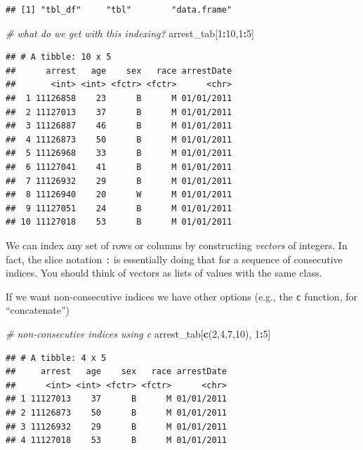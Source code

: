 \documentclass[]{book}
\newenvironment{Shaded}{\begin{snugshade}}{\end{snugshade}}
\newcommand{\KeywordTok}[1]{\textcolor[rgb]{0.13,0.29,0.53}{\textbf{#1}}}
\newcommand{\DecValTok}[1]{\textcolor[rgb]{0.00,0.00,0.81}{#1}}
\newcommand{\CommentTok}[1]{\textcolor[rgb]{0.56,0.35,0.01}{\textit{#1}}}
\newcommand{\OperatorTok}[1]{\textcolor[rgb]{0.81,0.36,0.00}{\textbf{#1}}}
\newcommand{\NormalTok}[1]{#1}
\theoremstyle{definition}
\theoremstyle{definition}
\theoremstyle{remark}
\begin{document}
\begin{verbatim}
## [1] "tbl_df"     "tbl"        "data.frame"
\end{verbatim}

\begin{Shaded}
\begin{Highlighting}[]
\CommentTok{# what do we get with this indexing?}
\NormalTok{arrest_tab[}\DecValTok{1}\OperatorTok{:}\DecValTok{10}\NormalTok{,}\DecValTok{1}\OperatorTok{:}\DecValTok{5}\NormalTok{]}
\end{Highlighting}
\end{Shaded}

\begin{verbatim}
## # A tibble: 10 x 5
##      arrest   age    sex   race arrestDate
##       <int> <int> <fctr> <fctr>      <chr>
##  1 11126858    23      B      M 01/01/2011
##  2 11127013    37      B      M 01/01/2011
##  3 11126887    46      B      M 01/01/2011
##  4 11126873    50      B      M 01/01/2011
##  5 11126968    33      B      M 01/01/2011
##  6 11127041    41      B      M 01/01/2011
##  7 11126932    29      B      M 01/01/2011
##  8 11126940    20      W      M 01/01/2011
##  9 11127051    24      B      M 01/01/2011
## 10 11127018    53      B      M 01/01/2011
\end{verbatim}

We can index any set of rows or columns by constructing \emph{vectors}
of integers. In fact, the slice notation \texttt{:} is essentially doing
that for a sequence of consecutive indices. You should think of vectors
as lists of values with the same class.

If we want non-consecutive indices we have other options (e.g., the
\texttt{c} function, for ``concatenate'')

\begin{Shaded}
\begin{Highlighting}[]
\CommentTok{# non-consecutive indices using c}
\NormalTok{arrest_tab[}\KeywordTok{c}\NormalTok{(}\DecValTok{2}\NormalTok{,}\DecValTok{4}\NormalTok{,}\DecValTok{7}\NormalTok{,}\DecValTok{10}\NormalTok{), }\DecValTok{1}\OperatorTok{:}\DecValTok{5}\NormalTok{]}
\end{Highlighting}
\end{Shaded}

\begin{verbatim}
## # A tibble: 4 x 5
##     arrest   age    sex   race arrestDate
##      <int> <int> <fctr> <fctr>      <chr>
## 1 11127013    37      B      M 01/01/2011
## 2 11126873    50      B      M 01/01/2011
## 3 11126932    29      B      M 01/01/2011
## 4 11127018    53      B      M 01/01/2011
\end{verbatim}
\end{document}
